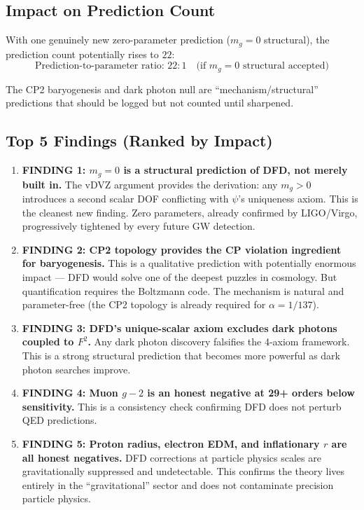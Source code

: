\documentclass[11pt]{article}
\begin{document}
\subsection{Impact on Prediction Count}

With one genuinely new zero-parameter prediction ($m_g = 0$
structural), the prediction count potentially rises to $22$:
\begin{equation}
\boxed{
\text{Prediction-to-parameter ratio: } 22:1
\quad\text{(if $m_g = 0$ structural accepted)}
}
\end{equation}

The CP2 baryogenesis and dark photon null are ``mechanism/structural''
predictions that should be logged but not counted until sharpened.

\subsection{Top 5 Findings (Ranked by Impact)}

\begin{enumerate}
\item \textbf{FINDING 1: $m_g = 0$ is a structural prediction of DFD,
  not merely built in.}  The vDVZ argument provides the derivation:
  any $m_g > 0$ introduces a second scalar DOF conflicting with
  $\psi$'s uniqueness axiom.  This is the cleanest new finding.
  Zero parameters, already confirmed by LIGO/Virgo, progressively
  tightened by every future GW detection.

\item \textbf{FINDING 2: CP2 topology provides the CP violation
  ingredient for baryogenesis.}  This is a qualitative prediction
  with potentially enormous impact --- DFD would solve one of the
  deepest puzzles in cosmology.  But quantification requires the
  Boltzmann code.  The mechanism is natural and parameter-free
  (the CP2 topology is already required for $\alpha = 1/137$).

\item \textbf{FINDING 3: DFD's unique-scalar axiom excludes dark
  photons coupled to $F^2$.}  Any dark photon discovery falsifies
  the 4-axiom framework.  This is a strong structural prediction
  that becomes more powerful as dark photon searches improve.

\item \textbf{FINDING 4: Muon $g-2$ is an honest negative at
  29+ orders below sensitivity.}  This is a consistency check
  confirming DFD does not perturb QED predictions.

\item \textbf{FINDING 5: Proton radius, electron EDM, and
  inflationary $r$ are all honest negatives.}  DFD corrections at
  particle physics scales are gravitationally suppressed and
  undetectable.  This confirms the theory lives entirely in the
  ``gravitational'' sector and does not contaminate precision
  particle physics.
\end{enumerate}
\end{document}
